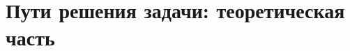 \documentclass[12pt,a4paper]{amsart}
\newtheorem{defin}{Определение}
\begin{document}
\section{Пути решения задачи: теоретическая часть}

\end{document}
